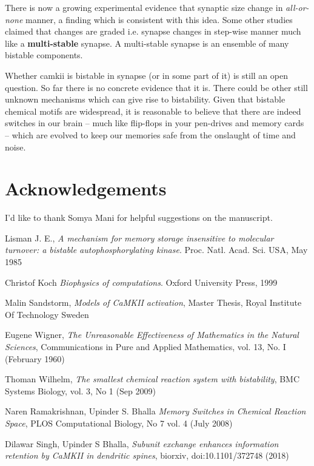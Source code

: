 \documentclass[]{resonance}
\begin{document}
There is now a growing experimental evidence that synaptic size change in
\textit{all-or-none} manner, a finding which is consistent with this idea. Some
other studies claimed that changes are graded i.e. synapse changes in step-wise
manner much like a \textbf{multi-stable} synapse. A multi-stable synapse is an
ensemble of many bistable components. 

Whether \gls{camkii} is bistable in synapse (or in some part of it) is still an
open question. So far there is no concrete evidence that it is. There could be
other still unknown mechanisms which can give rise to bistability. Given that
bistable chemical motifs are widespread, it is reasonable to believe that there
are indeed switches in our brain -- much like flip-flops in your pen-drives and
memory cards -- which are evolved to keep our memories safe from the onslaught
of time and noise.

\section*{Acknowledgements}
I'd like to thank Somya Mani for helpful suggestions on the manuscript.


\begin{thebibliography}{99} 
    Lisman J. E., 
    \textit{A mechanism for memory storage insensitive to molecular turnover: a
    bistable autophosphorylating kinase}. 
    Proc. Natl. Acad. Sci. USA, May 1985

    Christof Koch
    \textit{Biophysics of computations}.
    Oxford University Press, 1999

    Malin Sandstorm,
    \textit{Models of CaMKII activation},
    Master Thesis, Royal Institute Of Technology Sweden 

    Eugene Wigner,
    \textit{The Unreasonable Effectiveness of Mathematics in the Natural Sciences},
     Communications in Pure and Applied Mathematics, vol. 13, No. I (February 1960)

    Thoman Wilhelm,
    \textit{The smallest chemical reaction system with bistability},
    BMC Systems Biology, vol. 3, No 1 (Sep 2009)

    Naren Ramakrishnan, Upinder S. Bhalla
    \textit{Memory Switches in Chemical Reaction Space},
    PLOS Computational Biology, No 7 vol. 4 (July 2008)

    Dilawar Singh, Upinder S Bhalla,
    \textit{Subunit exchange enhances information retention by CaMKII in dendritic spines},
    biorxiv, doi:10.1101/372748 (2018)

\end{thebibliography}
\end{document}

